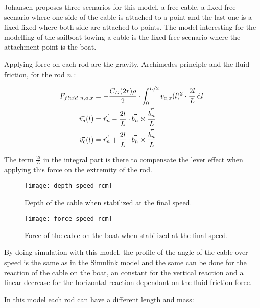 Johansen proposes three scenarios for this model, a free cable, a fixed-free scenario where one side of the cable is attached to a point and the last one is a fixed-fixed where both side are attached to points.
The model interesting for the modelling of the sailboat towing a cable is the fixed-free scenario where the attachment point is the boat.

Applying force on each rod are the gravity, Archimedes principle and the fluid friction, for the rod $n$ :

{
\begin{align}
\centering
F_{fluid~n,a,x} &= -\frac{C_D (2 r ) \rho}{2} \cdot \displaystyle \int_{0}^{L/2} v_{a,x}(l)^2 \cdot \frac{2l}{L} \, \mathrm{d}l\ \nonumber \\
\vec{v_{a}}(l) &= \vec{\dot{r_n}} - \frac{2 l}{L} \cdot \vec{b_n} \times \frac{\vec{\dot{b_n}}}{L} \nonumber \\
\vec{v_{c}}(l) &= \vec{\dot{r_n}} + \frac{2 l}{L} \cdot \vec{b_n} \times \frac{\vec{\dot{b_n}}}{L}
\end{align}
}

The term $\frac{2 l }{L}$ in the integral part is there to compensate the lever effect when applying this force on the extremity of the rod.



\begin{figure}[H]
\centering
    \begin{minipage}[b]{0.4\textwidth}
    \centering
    \texttt{[image: depth\_speed\_rcm]}
    \caption{Depth of the cable when stabilized at the final speed.}
    \label{fig:depthIndSpeed}
    \end{minipage}
    \hfill
    \begin{minipage}[b]{0.45\textwidth}
    \centering
    \texttt{[image: force\_speed\_rcm]}
    \caption{Force of the cable on the boat when stabilized at the final speed.}
    \label{fig:forceIndSpeed}
    \end{minipage}
\end{figure}

By doing simulation with this model, the profile of the angle of the cable over speed is the same as in the Simulink model and the same can be done for the reaction of the cable on the boat, an constant for the vertical reaction and a linear decrease for the horizontal reaction dependant on the fluid friction force.


In this model each rod can have a different length and mass:


